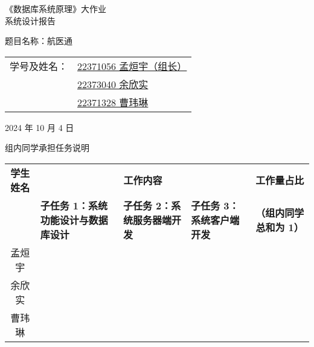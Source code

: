 \documentclass{article}
\begin{document}
\begin{center}
    \vspace*{3cm} %
    {\Huge 《数据库系统原理》大作业 \\[1cm]}
    {\LARGE 系统设计报告 \\[5cm]}
\end{center}

\begin{center}
    {\Large 题目名称：航医通} \\[4cm]
\end{center}

\begin{center}
    \begin{tabular}{ll}
        {\Large 学号及姓名：} & {\Large \underline{22371056 孟烜宇（组长）}} \\[0.5cm]
        & {\Large \underline{22373040 余欣实}} \\[0.5cm]
        & {\Large \underline{22371328 曹玮琳}} \\[3cm]
    \end{tabular}
\end{center}

\begin{center}
    {\Large 2024\hspace{0.35cm} 年 \hspace{0.35cm} 10\hspace{0.35cm} 月 \hspace{0.35cm} 4\hspace{0.35cm} 日}
\end{center}

\newpage

\begin{center}
    \vspace*{3cm}
    \LARGE 组内同学承担任务说明
\end{center}

\vspace{2.5cm}

\begin{center}
\renewcommand{\arraystretch}{3} %
\setlength{\tabcolsep}{10pt} %
\small %
\begin{tabular}{|c|p{2cm}|p{2cm}|p{2cm}|c|}
    \hline
    \textbf{学生姓名} & \multicolumn{3}{c|}{\textbf{工作内容}} & \textbf{工作量占比} \\ 
    \cline{2-4}
     & \textbf{子任务 1：系统功能设计与数据库设计} & \textbf{子任务 2：系统服务器端开发} & \textbf{子任务 3：系统客户端开发} & \textbf{（组内同学总和为 1）} \\
    \hline
    孟烜宇& & & & \\
    \hline
    余欣实& & & & \\
    \hline
    曹玮琳& & & & \\
    \hline
\end{tabular}
\end{center}
\end{document}
